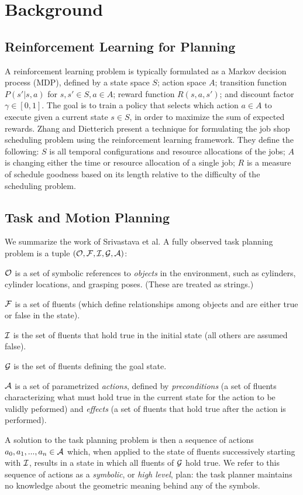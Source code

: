 \section{Background}
\subsection{Reinforcement Learning for Planning}
A reinforcement learning problem is typically formulated as
a Markov decision process (MDP), defined by a state space
$S$; action space $A$; transition function $P(s' | s, a)$ for $s, s' \in S, a \in A$;
reward function $R(s, a, s')$; and discount factor $\gamma \in [0, 1]$. The goal
is to train a policy that selects which action $a \in A$ to execute given a current
state $s \in S$, in order to maximize the sum of expected rewards. Zhang
and Dietterich present a technique for formulating the job shop scheduling
problem using the reinforcement learning framework. They define the following:
$S$ is all temporal configurations and resource allocations of the jobs; $A$ is changing
either the time or resource allocation of a single job; $R$ is a measure of schedule
goodness based on its length relative to the difficulty of the scheduling problem.
\subsection{Task and Motion Planning}
We summarize the work of Srivastava et al. A fully observed task planning
problem is a tuple $(\mathcal{O}, \mathcal{F}, \mathcal{I}, \mathcal{G}, \mathcal{A})$:

$\mathcal{O}$ is a set of symbolic references to \emph{objects} in the environment,
such as cylinders, cylinder locations, and grasping poses. (These are treated as strings.)

$\mathcal{F}$ is a set of fluents (which define relationships among objects and are either
true or false in the state).

$\mathcal{I}$ is the set of fluents that hold true in the initial state
(all others are assumed false).

$\mathcal{G}$ is the set of fluents defining the goal state.

$\mathcal{A}$ is a set of parametrized \emph{actions}, defined by \emph{preconditions} (a set
of fluents characterizing what must hold true in the current state for the action
to be validly peformed) and \emph{effects} (a set of fluents that hold true after
the action is performed).

A solution to the task planning problem is then a sequence of actions
$a_{0}, a_{1}, ..., a_{n} \in \mathcal{A}$ which, when applied to the state of fluents
successively starting with $\mathcal{I}$, results in a state in which all fluents of
$\mathcal{G}$ hold true. We refer to this sequence of actions as a \emph{symbolic}, or
\emph{high level}, plan: the task planner maintains no knowledge about the geometric meaning
behind any of the symbols.

